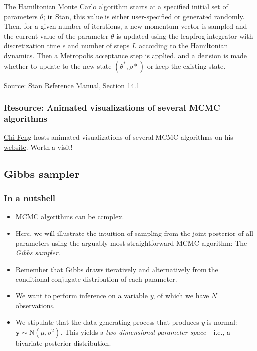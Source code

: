 \documentclass[
  11pt,
]{article}
\begin{document}
The Hamiltonian Monte Carlo algorithm starts at a
specified initial set of parameters \(\theta\); in Stan, this value is
either user-specified or generated randomly. Then, for a given number of
iterations, a new momentum vector is sampled and the current value of
the parameter \(\theta\) is updated using the leapfrog integrator with
discretization time \(\epsilon\) and number of steps \(L\) according to the
Hamiltonian dynamics. Then a Metropolis acceptance step is applied, and
a decision is made whether to update to the new state
\((\theta^{\ast},\rho{\ast})\) or keep the existing state.

Source: \href{https://mc-stan.org/docs/2_19/reference-manual/hamiltonian-monte-carlo.html}{Stan Reference Manual, Section
14.1}

\hypertarget{resource-animated-visualizations-of-several-mcmc-algorithms}{%
\subsubsection{Resource: Animated visualizations of several MCMC algorithms}\label{resource-animated-visualizations-of-several-mcmc-algorithms}}

\href{https://github.com/chi-feng}{Chi Feng} hosts animated visualizations of several MCMC algorithms on his \href{https://chi-feng.github.io/mcmc-demo/app.html}{website}. Worth a visit!

\hypertarget{gibbs-sampler}{%
\subsection{Gibbs sampler}\label{gibbs-sampler}}

\hypertarget{in-a-nutshell}{%
\subsubsection{In a nutshell}\label{in-a-nutshell}}

\begin{itemize}
\item
  MCMC algorithms can be complex.
\item
  Here, we will illustrate the intuition of sampling from the joint
  posterior of all parameters using the arguably most straightforward
  MCMC algorithm: The \emph{Gibbs sampler}.
\item
  Remember that Gibbs draws iteratively and alternatively from the
  conditional conjugate distribution of each parameter.
\item
  We want to perform inference on a variable \(y\), of which we have \(N\)
  observations.
\item
  We stipulate that the data-generating process that produces \(y\) is
  normal: \(\mathbf{y} \sim \text{N}(\mu, \sigma^2)\). This yields a
  \emph{two-dimensional parameter space} -- i.e., a bivariate posterior
  distribution.
\end{itemize}
\end{document}
